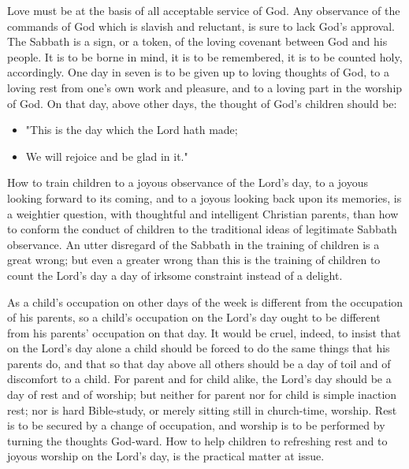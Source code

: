 \documentclass[
]{book}
\providecommand{\tightlist}{%
  \setlength{\itemsep}{0pt}\setlength{\parskip}{0pt}}
\begin{document}
Love must be at the basis of all acceptable service of God. Any observance of the commands of God which is slavish and reluctant, is sure to lack God's approval. The Sabbath is a sign, or a token, of the loving covenant between God and his people. It is to be borne in mind, it is to be remembered, it is to be counted holy, accordingly. One day in seven is to be given up to loving thoughts of God, to a loving rest from one's own work and pleasure, and to a loving part in the worship of God. On that day, above other days, the thought of God's children should be:

\begin{itemize}
\tightlist
\item
  "This is the day which the Lord hath made;
\item
  We will rejoice and be glad in it."
\end{itemize}

How to train children to a joyous observance of the Lord's day, to a joyous looking forward to its coming, and to a joyous looking back upon its memories, is a weightier question, with thoughtful and intelligent Christian parents, than how to conform the conduct of children to the traditional ideas of legitimate Sabbath observance. An utter disregard of the Sabbath in the training of children is a great wrong; but even a greater wrong than this is the training of children to count the Lord's day a day of irksome constraint instead of a delight.

As a child's occupation on other days of the week is different from the occupation of his parents, so a child's occupation on the Lord's day ought to be different from his parents' occupation on that day. It would be cruel, indeed, to insist that on the Lord's day alone a child should be forced to do the same things that his parents do, and that so that day above all others should be a day of toil and of discomfort to a child. For parent and for child alike, the Lord's day should be a day of rest and of worship; but neither for parent nor for child is simple inaction rest; nor is hard Bible-study, or merely sitting still in church-time, worship. Rest is to be secured by a change of occupation, and worship is to be performed by turning the thoughts God-ward. How to help children to refreshing rest and to joyous worship on the Lord's day, is the practical matter at issue.
\end{document}
